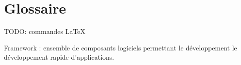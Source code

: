 \cleardoublepage

\chapter*{Glossaire}




TODO: commandes LaTeX

Framework : ensemble de composants logiciels permettant le développement le développement rapide d'applications.